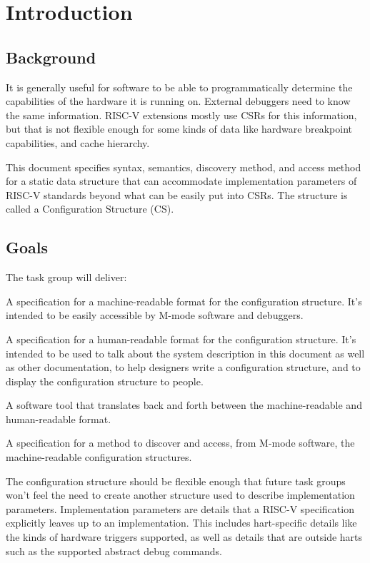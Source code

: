 \chapter{Introduction}

\section{Background}

It is generally useful for software to be able to programmatically determine
the capabilities of the hardware it is running on. External debuggers need to
know the same information. RISC-V extensions mostly use CSRs for this
information, but that is not flexible enough for some kinds of data like
hardware breakpoint capabilities, and cache hierarchy.

This document specifies syntax, semantics, discovery method, and access method
for a static data structure that can accommodate implementation parameters of
RISC-V standards beyond what can be easily put into CSRs. The structure is
called a Configuration Structure (CS).

\section{Goals}

\begin{steps}{The task group will deliver:}
\item A specification for a machine-readable format for the configuration
    structure. It's intended to be easily accessible by M-mode software and
    debuggers.
\item A specification for a human-readable format for the configuration
    structure. It's intended to be used to talk about the system description in
    this document as well as other documentation, to help designers write a
    configuration structure, and to display the configuration structure to
    people.
\item A software tool that translates back and forth between the
    machine-readable and human-readable format.
\item A specification for a method to discover and access, from M-mode
    software, the machine-readable configuration structures.
\end{steps}

The configuration structure should be flexible enough that future task groups
won’t feel the need to create another structure used to describe implementation
parameters. Implementation parameters are details that a RISC-V specification
explicitly leaves up to an implementation. This includes hart-specific details
like the kinds of hardware triggers supported, as well as details that are
outside harts such as the supported abstract debug commands.

